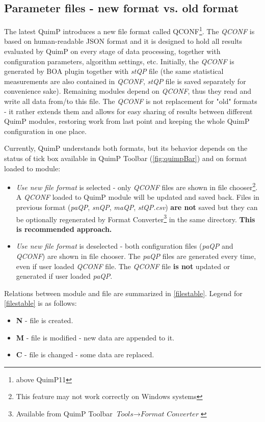 \documentclass[a4paper,12pt]{article}
\begin{document}
\subsection{Parameter files - new format vs. old format}
The latest QuimP introduces a new file format called QCONF\footnote{above QuimP11}. The \textit{QCONF} is based on human-readable JSON format and it is designed to hold all results evaluated by QuimP on every stage of data processing, together with configuration parameters, algorithm settings, etc. 
Initially, the \textit{QCONF} is generated by BOA plugin together with \textit{stQP} file (the same statistical measurements are also contained in \textit{QCONF}, \textit{stQP} file is saved separately for convenience sake). Remaining modules depend on \textit{QCONF}, thus they read and write all data from/to this file. The \textit{QCONF} is not replacement for "old" formats - it rather extends them and allows for easy sharing of results between different QuimP modules, restoring work from last point and keeping the whole QuimP configuration in one place.   

Currently, QuimP understands both formats, but its behavior depends on the status of tick box available in QuimP Toolbar (\autoref{fig:quimpBar}) and on format loaded to module:
\begin{itemize}
	\item \textit{Use new file format} is selected - only \textit{QCONF} files are shown in file chooser\footnote{This feature may not work correctly on Windows systems}. A \textit{QCONF} loaded to QuimP module will be updated and saved back. Files in previous format (\textit{paQP}, \textit{snQP}, \textit{maQP}, \textit{stQP.csv}) \textbf{are not} saved but they can be optionally regenerated by Format Converter\footnote{Available from QuimP Toolbar $\textit{Tools}\rightarrow\textit{Format Converter}$} in the same directory. \textbf{This is recommended approach.}
	\item \textit{Use new file format} is deselected - both configuration files (\textit{paQP} and \textit{QCONF}) are shown in file chooser. The \textit{paQP} files are generated every time, even if user loaded \textit{QCONF} file. The \textit{QCONF} file \textbf{is not} updated or generated if user loaded \textit{paQP}. 
\end{itemize}   

Relations between module and file are summarized in \autoref{filestable}. Legend for \autoref{filestable} is as follows:
\begin{itemize}
	\item \textbf{N} - file is created.
	\item \textbf{M} - file is modified - new data are appended to it.
	\item \textbf{C} - file is changed - some data are replaced.
\end{itemize}
\end{document}
